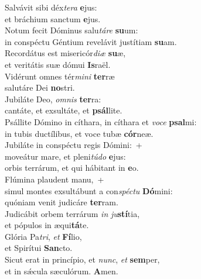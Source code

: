 \evenverse Salvávit sibi déx\textit{te}\textit{ra} \textbf{e}jus:~\*\\
\evenverse et bráchium sanctum \textbf{e}jus.\\
\oddverse Notum fecit Dóminus salu\textit{tá}\textit{re} \textbf{su}um:~\*\\
\oddverse in conspéctu Géntium revelávit justítiam \textbf{su}am.\\
\evenverse Recordátus est misericór\textit{di}\textit{æ} \textbf{su}æ,~\*\\
\evenverse et veritátis suæ dómui \textbf{Is}raël.\\
\oddverse Vidérunt omnes tér\textit{mi}\textit{ni} \textbf{ter}ræ~\*\\
\oddverse salutáre Dei \textbf{no}stri.\\
\evenverse Jubiláte Deo, \textit{om}\textit{nis} \textbf{ter}ra:~\*\\
\evenverse cantáte, et exsultáte, et \textbf{psál}lite.\\
\oddverse Psállite Dómino in cíthara, in cíthara et \textit{vo}\textit{ce} \textbf{psal}mi:~\*\\
\oddverse in tubis ductílibus, et voce tubæ \textbf{cór}neæ.\\
\evenverse Jubiláte in conspéctu regis Dómini:~+\\
\evenverse  moveátur mare, et pleni\textit{tú}\textit{do} \textbf{e}jus:~\*\\
\evenverse orbis terrárum, et qui hábitant in \textbf{e}o.\\
\oddverse Flúmina plaudent manu,~+\\
\oddverse  simul montes exsultábunt a con\textit{spé}\textit{ctu} \textbf{Dó}mini:~\*\\
\oddverse quóniam venit judicáre \textbf{ter}ram.\\
\evenverse Judicábit orbem terrárum \textit{in} \textit{ju}\textbf{stí}tia,~\*\\
\evenverse et pópulos in æqui\textbf{tá}te.\\
\oddverse Glória Pa\textit{tri}, \textit{et} \textbf{Fí}lio,~\*\\
\oddverse et Spirítui \textbf{San}cto.\\
\evenverse Sicut erat in princípio, et \textit{nunc}, \textit{et} \textbf{sem}per,~\*\\
\evenverse et in sǽcula sæculórum. \textbf{A}men.\\
